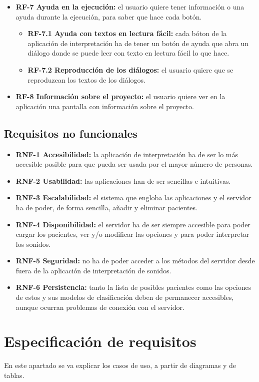 \begin{itemize}
\begin{itemize}
	\end{itemize}
	\item \textbf{RF-7 Ayuda en la ejecución:} el usuario quiere tener información o una ayuda durante la ejecución, para saber que hace cada botón.
	\begin{itemize}
		\item \textbf{RF-7.1 Ayuda con textos en lectura fácil:} cada bóton de la aplicación de interpretación ha de tener un botón de ayuda que abra un diálogo donde se puede leer con texto en lectura fácil lo que hace.
		\item \textbf{RF-7.2 Reproducción de los diálogos:} el usuario quiere que se reproduzcan los textos de los diálogos.
	\end{itemize}
	\item \textbf{RF-8 Información sobre el proyecto:} el usuario quiere ver en la aplicación una pantalla con información sobre el proyecto.
\end{itemize}

\subsection{Requisitos no funcionales}
\begin{itemize}
	\item \textbf{RNF-1 Accesibilidad:} la aplicación de interpretación ha de ser lo más accesible posible para que pueda ser usada por el mayor número de personas.
	\item \textbf{RNF-2 Usabilidad:} las aplicaciones han de ser sencillas e intuitivas.
	\item \textbf{RNF-3 Escalabilidad:} el sistema que engloba las aplicaciones y el servidor ha de poder, de forma sencilla, añadir y eliminar pacientes.
	\item \textbf{RNF-4 Disponibilidad:} el servidor ha de ser siempre accesible para poder cargar los pacientes, ver y/o modificar las opciones y para poder interpretar los sonidos.
	\item \textbf{RNF-5 Seguridad:} no ha de poder acceder a los métodos del servidor desde fuera de la aplicación de interpretación de sonidos.
	\item \textbf{RNF-6 Persistencia:} tanto la lista de posibles pacientes como las opciones de estos y sus modelos de clasificación deben de permanecer accesibles, aunque ocurran problemas de conexión con el servidor.
\end{itemize}

\section{Especificación de requisitos}
En este apartado se va explicar los casos de uso, a partir de diagramas y de tablas.
